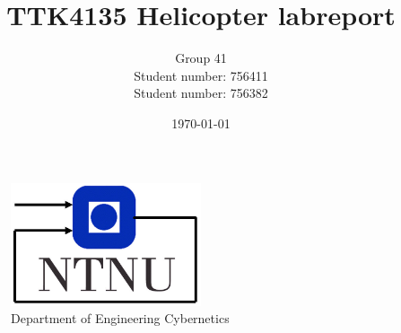 \documentclass[11pt, a4paper, USenglish]{article} %
\begin{document}
\title{TTK4135 Helicopter labreport}
\author{Group 41\\Student number: 756411\\Student number: 756382}
\date{\today}
\begin{titlepage}
    \maketitle
    \begin{figure}
    \centering
    \includegraphics[width=0.5\textwidth]{figures/itk_ntnu}\\
    Department of Engineering Cybernetics
    \end{figure}
    \thispagestyle{empty}
\end{titlepage}

\newpage

\thispagestyle{empty} %

\newpage
\tableofcontents
\thispagestyle{empty} %

\newpage
\setcounter{page}{1}






%

\newpage
{}
\printbibliography{}
\label{sec:bibliography}
\end{document}
